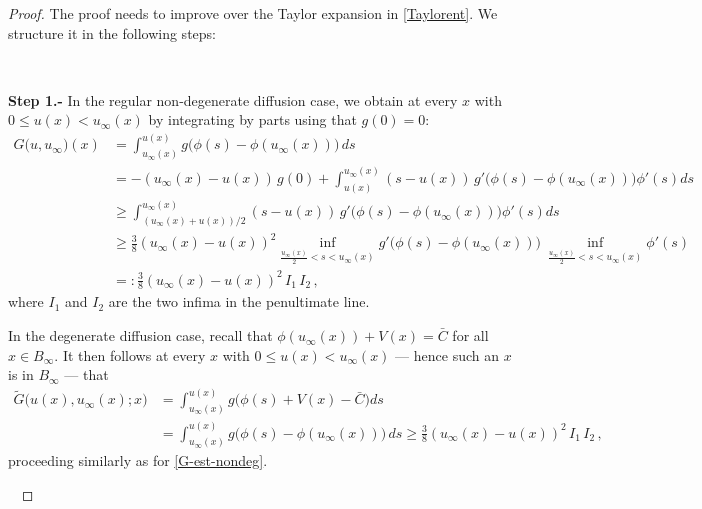 \documentclass[reqno]{amsart}
\newcommand{\uinf}{u_\infty}
\begin{document}
\begin{proof}
The proof needs to improve over the Taylor expansion in \eqref{Taylorent}. We structure it in the following steps:

\

{\bf Step 1.-}
In the regular non-degenerate diffusion case, we obtain
at every $x$ with $0\leq u(x)<\uinf(x)$ by integrating by parts using that $g(0)=0$:
 \begin{align}
        G\big(u,u_\infty\big)(x)
        &= \int^{u(x)}_{\uinf(x)} g\big(\phi(s)-\phi(\uinf(x))\big) \, ds \nonumber\\
        &= - (\uinf(x)-u(x))\,g(0) +\int
        _{u(x)}^{\uinf(x)}(s-u(x))\,g'\big(\phi(s)-\phi(\uinf(x))\big)\phi'(s)ds  \nonumber \\
        &\ge \int_{(\uinf(x)+u(x))/2}^{u_\infty(x)}(s-u(x))\,g'\big(\phi(s)-\phi(\uinf(x))\big)\phi'(s)ds \nonumber\\
        &\ge {\frac38} \left(\uinf(x)-u(x)\right)^2\inf_{\frac{\uinf(x)}2<s<\uinf(x)} g'\big(\phi(s)-\phi(\uinf(x))\big)\: \inf_{\frac{\uinf(x)}2<s<\uinf(x)}\phi'(s)\nonumber \\
        &=: {\frac38}\left(\uinf(x)-u(x)\right)^2 \, I_1\, I_2\,, \label{G-est-nondeg}
    \end{align}
where $I_1$ and $I_2$ are the two infima in the penultimate line.

In the degenerate diffusion case, recall that $\phi(u_\infty(x))+V(x)=\bar C$ for all $x\in B_\infty$. It then follows at every $x$ with $0\leq u(x) < \uinf(x)$ --- hence such an $x$ is in $B_\infty$ --- that
    \begin{align*}
        \tilde G\big(u(x),\uinf(x);x\big)
        &= \int^{u(x)}_{\uinf(x)} 
        g\big(\phi(s)+V(x)-\bar C\big)ds  \\
        &= \int^{u(x)}_{\uinf(x)} g\big(\phi(s)-\phi(\uinf(x))\big) \, ds 
        \geq {\frac38}\left(\uinf(x)-u(x)\right)^2 \, I_1\, I_2\,,
    \end{align*}
    proceeding similarly as for \eqref{G-est-nondeg}.

\


\end{proof}
\end{document}
